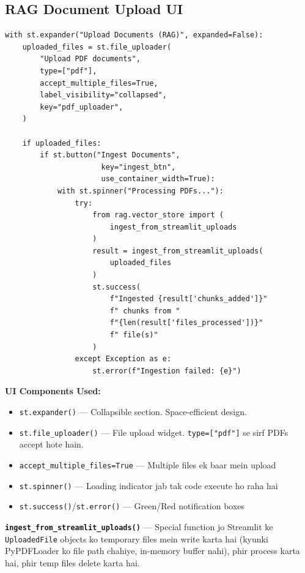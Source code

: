 \documentclass[12pt, a4paper]{article}
\begin{document}
\subsection{RAG Document Upload UI}

\begin{lstlisting}[style=pythonstyle, title={\color{accentgreen}\faIcon{file} app.py --- PDF Upload Section}]
with st.expander("Upload Documents (RAG)", expanded=False):
    uploaded_files = st.file_uploader(
        "Upload PDF documents",
        type=["pdf"],
        accept_multiple_files=True,
        label_visibility="collapsed",
        key="pdf_uploader",
    )

    if uploaded_files:
        if st.button("Ingest Documents",
                      key="ingest_btn",
                      use_container_width=True):
            with st.spinner("Processing PDFs..."):
                try:
                    from rag.vector_store import (
                        ingest_from_streamlit_uploads
                    )
                    result = ingest_from_streamlit_uploads(
                        uploaded_files
                    )
                    st.success(
                        f"Ingested {result['chunks_added']}"
                        f" chunks from "
                        f"{len(result['files_processed'])}"
                        f" file(s)"
                    )
                except Exception as e:
                    st.error(f"Ingestion failed: {e}")
\end{lstlisting}

\begin{codestorybox}
\textbf{UI Components Used:}
\begin{itemize}
\item \texttt{st.expander()} --- Collapsible section. Space-efficient design.
\item \texttt{st.file\_uploader()} --- File upload widget. \texttt{type=["pdf"]} se sirf PDFs accept hote hain.
\item \texttt{accept\_multiple\_files=True} --- Multiple files ek baar mein upload
\item \texttt{st.spinner()} --- Loading indicator jab tak code execute ho raha hai
\item \texttt{st.success()}/\texttt{st.error()} --- Green/Red notification boxes
\end{itemize}

\textbf{\texttt{ingest\_from\_streamlit\_uploads()}} --- Special function jo Streamlit ke \texttt{UploadedFile} objects ko temporary files mein write karta hai (kyunki PyPDFLoader ko file path chahiye, in-memory buffer nahi), phir process karta hai, phir temp files delete karta hai.
\end{codestorybox}
\end{document}
